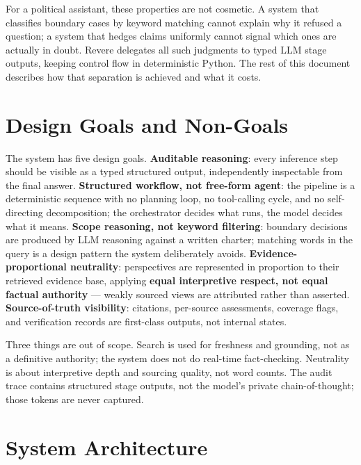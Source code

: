 \documentclass[11pt,letterpaper]{article}
\newcommand{\kw}[1]{\textbf{#1}}
\begin{document}
For a political assistant, these properties are not cosmetic. A system that
classifies boundary cases by keyword matching cannot explain why it refused a
question; a system that hedges claims uniformly cannot signal which ones are
actually in doubt. Revere delegates all such judgments to typed LLM stage
outputs, keeping control flow in deterministic Python. The rest of this document
describes how that separation is achieved and what it costs.


\section{Design Goals and Non-Goals}
\label{sec:goals}

The system has five design goals. \kw{Auditable reasoning}: every inference
step should be visible as a typed structured output, independently inspectable
from the final answer. \kw{Structured workflow, not free-form agent}: the
pipeline is a deterministic sequence with no planning loop, no tool-calling
cycle, and no self-directing decomposition; the orchestrator decides what runs,
the model decides what it means. \kw{Scope reasoning, not keyword filtering}:
boundary decisions are produced by LLM reasoning against a written charter;
matching words in the query is a design pattern the system deliberately avoids.
\kw{Evidence-proportional neutrality}: perspectives are represented in
proportion to their retrieved evidence base, applying \kw{equal interpretive
respect, not equal factual authority} --- weakly sourced views are attributed
rather than asserted. \kw{Source-of-truth visibility}: citations, per-source
assessments, coverage flags, and verification records are first-class outputs,
not internal states.

Three things are out of scope. Search is used for freshness and grounding, not
as a definitive authority; the system does not do real-time fact-checking.
Neutrality is about interpretive depth and sourcing quality, not word counts.
The audit trace contains structured stage outputs, not the model's private
chain-of-thought; those tokens are never captured.


\section{System Architecture}
\label{sec:arch}
\end{document}
